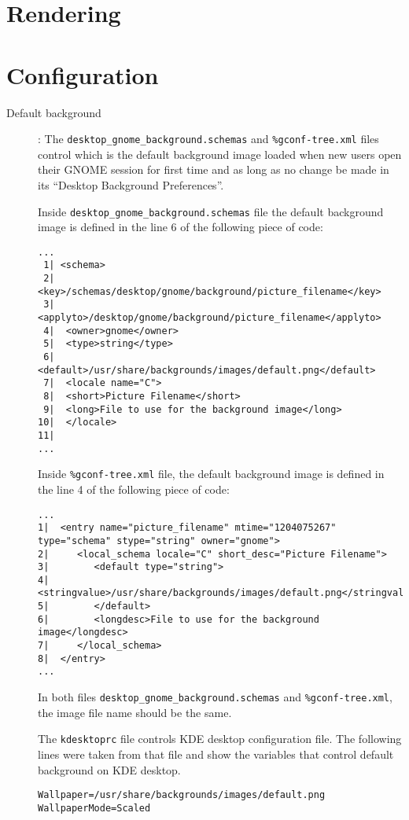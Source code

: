 \documentclass{article}
\begin{document}
\section{Rendering}

\section{Configuration}



\begin{description}

\item[Default background]: The
\texttt{desktop\_gnome\_background.schemas} and \texttt{\%gconf-tree.xml}
files control which is the default background image loaded when new
users open their GNOME session for first time and as long as no change
be made in its ``Desktop Background Preferences''.

Inside \texttt{desktop\_gnome\_background.schemas} file the default
background image is defined in the line 6 of the following piece of
code:

\begin{verbatim}
...
 1| <schema>
 2|  <key>/schemas/desktop/gnome/background/picture_filename</key>
 3|  <applyto>/desktop/gnome/background/picture_filename</applyto>
 4|  <owner>gnome</owner>
 5|  <type>string</type>
 6|  <default>/usr/share/backgrounds/images/default.png</default>
 7|  <locale name="C">
 8|  <short>Picture Filename</short>
 9|  <long>File to use for the background image</long>
10|  </locale>
11|
...
\end{verbatim}

Inside \texttt{\%gconf-tree.xml} file, the default background image is
defined in the line 4 of the following piece of code:

\begin{verbatim}
...
1|  <entry name="picture_filename" mtime="1204075267" type="schema" stype="string" owner="gnome">
2|     <local_schema locale="C" short_desc="Picture Filename">
3|        <default type="string">
4|           <stringvalue>/usr/share/backgrounds/images/default.png</stringvalue>
5|        </default>
6|        <longdesc>File to use for the background image</longdesc>
7|     </local_schema>
8|  </entry>
...
\end{verbatim}

In both files \texttt{desktop\_gnome\_background.schemas} and
\texttt{\%gconf-tree.xml}, the image file name should be the same.

The \texttt{kdesktoprc} file controls KDE desktop configuration file.
The following lines were taken from that file and show the variables
that control default background on KDE desktop.

\begin{verbatim}
Wallpaper=/usr/share/backgrounds/images/default.png
WallpaperMode=Scaled
\end{verbatim}

\end{description}
\end{document}
